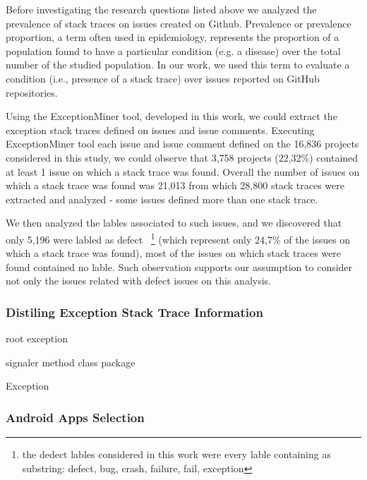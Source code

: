 \documentclass[conference]{IEEEtran}
\begin{document}
Before investigating the research questions listed above we analyzed the prevalence of stack traces 
on issues created on Github. Prevalence or prevalence proportion, a term often used in epidemiology,
represents the proportion of a population found to have a particular condition
(e.g. a disease) over the total number of the studied population. In our work, we used
this term to evaluate a condition (i.e., presence of a stack trace) over issues
reported on GitHub repositories.

Using the ExceptionMiner tool, developed in this work, we could extract the exception stack traces defined on issues and issue comments. Executing ExceptionMiner tool each issue and issue comment defined on the 16,836 projects considered in this study, we could observe that 3,758 projects (22,32\%) contained at least 1 issue on which a stack trace was found. Overall the number of issues on which a stack trace was found was 21,013 from which 28,800 stack traces were extracted and analyzed - some issues defined more than one stack trace.

We then analyzed the lables associated to such issues, and we discovered that only 5,196 were labled as defect ~\footnote{the dedect lables considered in this work were every lable containing as substring: defect, bug, crash, failure, fail, exception} (which represent only 24,7\% of the issues on which a stack trace was found), most of the issues on which stack traces were found contained no lable. Such observation supports our assumption to consider not only the issues related with defect issues on this analysis.

\subsubsection{Distiling Exception Stack Trace Information}

\- root exception

\- signaler
\- method
\- class
\- package

\- Exception



\subsubsection{Android Apps Selection}
\label{sec:android}


\end{document}
